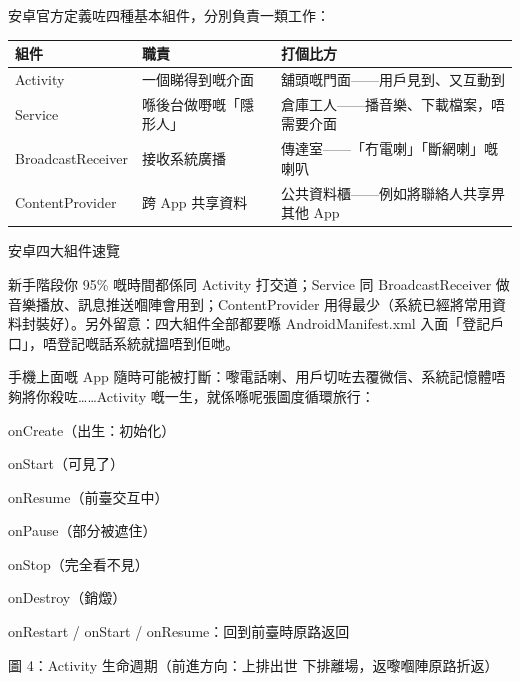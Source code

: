 


安卓官方定義咗四種基本組件，分別負責一類工作：

\begin{center}
\begin{tabularx}{\linewidth}{|X|X|X|}
\hline
\textbf{組件} & \textbf{職責} & \textbf{打個比方} \tabularnewline
\hline
Activity & 一個睇得到嘅介面 & 舖頭嘅門面——用戶見到、又互動到 \tabularnewline
Service & 喺後台做嘢嘅「隱形人」 & 倉庫工人——播音樂、下載檔案，唔需要介面 \tabularnewline
BroadcastReceiver & 接收系統廣播 & 傳達室——「冇電喇」「斷網喇」嘅喇叭 \tabularnewline
ContentProvider & 跨 App 共享資料 & 公共資料櫃——例如將聯絡人共享畀其他 App \tabularnewline
\hline
\end{tabularx}
\end{center}

\begin{center}\small\color{gray}安卓四大組件速覽\end{center}

新手階段你 95\% 嘅時間都係同 Activity 打交道；Service 同 BroadcastReceiver 做音樂播放、訊息推送嗰陣會用到；ContentProvider 用得最少（系統已經將常用資料封裝好）。另外留意：四大組件全部都要喺 AndroidManifest.xml 入面「登記戶口」，唔登記嘅話系統就搵唔到佢哋。


手機上面嘅 App 隨時可能被打斷：嚟電話喇、用戶切咗去覆微信、系統記憶體唔夠將你殺咗……Activity 嘅一生，就係喺呢張圖度循環旅行：

onCreate（出生：初始化）

onStart（可見了）

onResume（前臺交互中）

onPause（部分被遮住）

onStop（完全看不見）

onDestroy（銷燬）

onRestart / onStart / onResume：回到前臺時原路返回

\begin{center}\small\color{gray}圖 4：Activity 生命週期（前進方向：上排出世 下排離場，返嚟嗰陣原路折返）\end{center}

